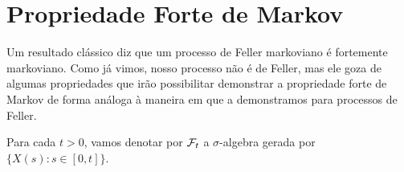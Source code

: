 
\section{Propriedade Forte de Markov}
\label{sec:prop-forte-markov}

Um resultado clássico diz que um processo de Feller markoviano é
fortemente markoviano. Como já vimos, nosso processo não é de Feller,
mas ele goza de algumas propriedades que irão possibilitar demonstrar
a propriedade forte de Markov de forma análoga à maneira em que  a
demonstramos para processos de Feller.

Para cada $t > 0$, vamos denotar por ${\mathcal{F}}_t$ a $\sigma$-algebra gerada
por $\{X(s): s \in [0, t]\}$.

